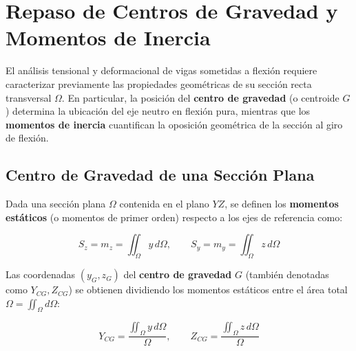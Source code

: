 
\section{Repaso de Centros de Gravedad y Momentos de Inercia}



El análisis tensional y deformacional de vigas sometidas a flexión requiere caracterizar previamente las propiedades geométricas de su sección recta transversal $\Omega$. En particular, la posición del \textbf{centro de gravedad} (o centroide $G$) determina la ubicación del eje neutro en flexión pura, mientras que los \textbf{momentos de inercia} cuantifican la oposición geométrica de la sección al giro de flexión.



\subsection{Centro de Gravedad de una Sección Plana}



Dada una sección plana $\Omega$ contenida en el plano $YZ$, se definen los \textbf{momentos estáticos} (o momentos de primer orden) respecto a los ejes de referencia como:

\begin{equation}
    S_z = m_z = \iint_{\Omega} y \, d\Omega, \qquad S_y = m_y = \iint_{\Omega} z \, d\Omega
\end{equation}

Las coordenadas $(y_G, z_G)$ del \textbf{centro de gravedad} $G$ (también denotadas como $Y_{CG}, Z_{CG}$) se obtienen dividiendo los momentos estáticos entre el área total $\Omega = \iint_{\Omega} d\Omega$:

\begin{equation}
    Y_{CG} = \frac{\iint_{\Omega} y \, d\Omega}{\Omega}, \qquad Z_{CG} = \frac{\iint_{\Omega} z \, d\Omega}{\Omega}
\end{equation}



